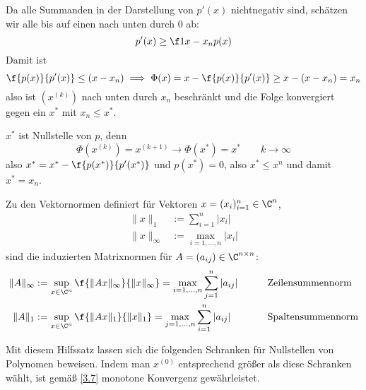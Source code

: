 \documentclass[11pt]{scrbook}
\begin{document}
\begin{st}
\begin{note}
		Da alle Summanden in der Darstellung von $p'(x)$ nichtnegativ sind, schätzen wir alle bis auf einen nach unten durch $0$ ab:
		\[
			p'(x) \ge \f 1{x-x_n}p(x)
		\]
		Damit ist
		\[
			\f {p(x)}{p'(x)} \le (x-x_n)
			\implies
			\Phi(x) = x - \f {p(x)}{p'(x)} \ge x-(x-x_n) = x_n
		\]
		also ist $(x^{(k)})$ nach unten durch $x_n$ beschränkt und die Folge konvergiert gegen ein $x^*$ mit $x_n \le x^*$.

		$x^*$ ist Nullstelle von $p$, denn
		\[
			\Phi(x^{(k)}) = x^{(k+1)}
			\to
			\Phi(x^*) = x^*
			\qquad k\to\infty
		\]
		also $x^* = x^* - \f {p(x^*)}{p'(x^*)}$ und $p(x^*) = 0$, also $x^* \le x^n$ und damit $x^*=x_n$.
	\end{note}
\end{st}

\begin{st} \label{3.8}
	Zu den Vektornormen definiert für Vektoren $x=(x_i)_{i=1}^n \in \C^n$,
	\begin{align*}
		\|x\|_1 &:= \sum_{i=1}^n |x_i| \\
		\|x\|_\infty &:= \max_{i = 1,\dotsc,n} |x_i|
	\end{align*}
	sind die induzierten Matrixnormen für $A=(a_{ij}) \in \C^{n\times n}$:
	\begin{alignat*}{3}
		\|A\|_\infty &:= \sup_{x\in \C^n} \f{\|Ax\|_\infty}{\|x\|_\infty} = \max_{i=1,\dotsc,n} \sum_{j=1}^n |a_{ij}| &
			& \qquad\text{Zeilensummennorm} \\
		\|A\|_1 &:= \sup_{x\in \C^n} \f{\|Ax\|_1}{\|x\|_1} = \max_{j=1,\dotsc,n} \sum_{i=1}^n |a_{ij}| &
			& \qquad\text{Spaltensummennorm}
	\end{alignat*}
\end{st}

Mit diesem Hilfssatz lassen sich die folgenden Schranken für Nullstellen von Polynomen beweisen.
Indem man $x^{(0)}$ entsprechend größer als diese Schranken wählt, ist gemäß \ref{3.7} monotone Konvergenz gewährleistet.
\end{document}

